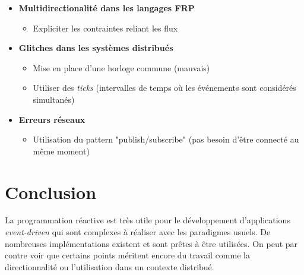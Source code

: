 \documentclass[10pt,final]{IEEEtran}
\begin{document}
\begin{itemize}
    \item \textbf{Multidirectionalité dans les langages FRP}
        \begin{itemize}
            \item Expliciter les contraintes reliant les flux 
        \end{itemize}
    \item \textbf{Glitches dans les systèmes distribués}
        \begin{itemize}
            \item Mise en place d'une horloge commune (mauvais)
            \item Utiliser des \textit{ticks} (intervalles de temps où les événements sont considérés simultanés)
        \end{itemize}
    \item \textbf{Erreurs réseaux}
        \begin{itemize}
            \item Utilisation du pattern "publish/subscribe" (pas besoin d'être connecté au même moment)
        \end{itemize}
\end{itemize}

\section{Conclusion}

La programmation réactive est très utile pour le développement d'applications \textit{event-driven} qui sont complexes à réaliser avec les paradigmes usuels. De nombreuses implémentations existent et sont prêtes à être utilisées. On peut par contre voir que certains points méritent encore du travail comme la directionnalité ou l'utilisation dans un contexte distribué.
\end{document}
